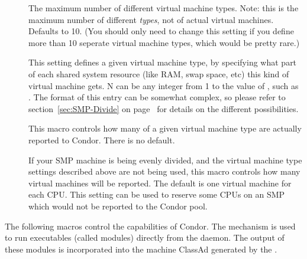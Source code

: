 \begin{description}

\item[]
\label{param:MaxVirtualMachineTypes}
  The maximum number of different virtual machine types.  
  Note: this is the maximum number of different \emph{types}, not of
  actual virtual machines.
  Defaults to 10.  
  (You should only need to change this setting if you define more than
  10 seperate virtual machine types, which would be pretty rare.)

\item[]
\label{param:VirtualMachineTypeN}
  This setting defines a given virtual machine type, by specifying
  what part of each shared system resource (like RAM, swap space, etc)
  this kind of virtual machine gets.
  N can be any integer from 1 to the value of
  , such as
  . 
  The format of this entry can be somewhat complex, so please refer to
  section~\ref{sec:SMP-Divide} on page~\pageref{sec:SMP-Divide} for
  details on the different possibilities.

\item[]
\label{param:NumVirtualMachinesTypeN}
  This macro controls how many of a given virtual machine type
  are actually reported to Condor.
  There is no default.

\item[]
\label{param:NumVirtualMachines}
  If your SMP machine is being evenly divided, and the virtual
  machine type settings described above are not being used, this
  macro controls how many virtual machines will be reported.  
  The default is one virtual machine for each CPU.
  This setting can be used to reserve some CPUs on an SMP which would
  not be reported to the Condor pool.

\end{description}

The following macros control the  capabilities of Condor.
The  mechanism is used to run executables (called
modules) directly from the  daemon.
The output of these modules
is incorporated into the machine ClassAd generated by the .

